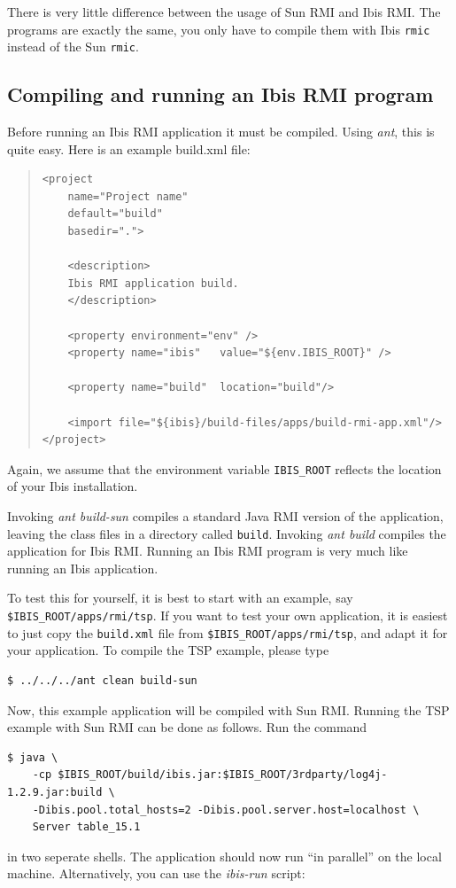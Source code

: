 \documentclass[10pt]{article}
\newcommand{\mysubsection}[1]{\subsection{#1}\label{#1}}
\newcommand{\remark}[1]{[\emph{#1}]}
\begin{document}
There is very little difference between the usage of Sun RMI and Ibis
RMI. The programs are exactly the same, you only have to compile them
with Ibis \texttt{rmic} instead of the Sun \texttt{rmic}. 



\mysubsection{Compiling and running an Ibis RMI program}

Before running an Ibis RMI application it must be compiled.
Using \emph{ant}, this is quite easy. Here is an example build.xml file:

{\small
\begin{quote}
\begin{verbatim}
<project
    name="Project name"
    default="build"
    basedir=".">

    <description>
    Ibis RMI application build.
    </description>

    <property environment="env" />
    <property name="ibis"   value="${env.IBIS_ROOT}" />

    <property name="build"  location="build"/>

    <import file="${ibis}/build-files/apps/build-rmi-app.xml"/>
</project>
\end{verbatim}
\end{quote}
}

Again, we assume that the environment variable \texttt{IBIS\_ROOT} reflects
the location of your Ibis installation.

Invoking \emph{ant build-sun} compiles a standard Java RMI version of
the application, leaving the class files in a directory called \texttt{build}.
Invoking \emph{ant build} compiles the application for Ibis RMI.
Running an Ibis RMI program is very much like running an Ibis application.

To test this for yourself, it is best to start with
an example, say \texttt{\$IBIS\_ROOT/apps/rmi/tsp}. 
If you want to test your own application, it is easiest to just copy
the \texttt{build.xml} file from \texttt{\$IBIS\_ROOT/apps/rmi/tsp}, and adapt it for your
application. 
To compile the TSP example, please type

\noindent
{\small
\begin{verbatim}
$ ../../../ant clean build-sun
\end{verbatim}
}
\noindent
Now, this example application will be compiled with Sun RMI.
Running the TSP example with Sun RMI can be done as follows. Run the command

\noindent
{\small
\begin{verbatim}
$ java \
    -cp $IBIS_ROOT/build/ibis.jar:$IBIS_ROOT/3rdparty/log4j-1.2.9.jar:build \
    -Dibis.pool.total_hosts=2 -Dibis.pool.server.host=localhost \
    Server table_15.1
\end{verbatim}
}
\noindent
in two seperate shells. The application should now run ``in parallel''
on the local machine. Alternatively, you can use the \emph{ibis-run} script:
\end{document}

